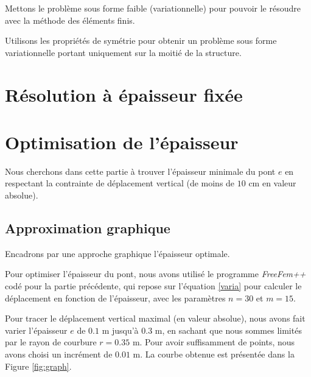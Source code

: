 \documentclass{article}
\begin{document}
    \begin{problem}{1}
    Mettons le problème sous forme faible (variationnelle) pour pouvoir le résoudre avec la méthode des éléments finis.
    \end{problem}
      
    
    

    \begin{problem}{2}
    Utilisons les propriétés de symétrie pour obtenir un problème sous forme variationnelle portant uniquement sur la moitié de la structure.
    \end{problem}
    
    

    \section{Résolution à épaisseur fixée}
        

    \section{Optimisation de l'épaisseur}
    Nous cherchons dans cette partie à trouver l'épaisseur minimale du pont $e$ en respectant la contrainte de déplacement vertical (de moins de $10$ cm en valeur absolue).

    \subsection{Approximation graphique}
    \begin{problem}{5}
        Encadrons par une approche graphique l'épaisseur optimale.
    \end{problem}
    Pour optimiser l'épaisseur du pont,
     nous avons utilisé le programme \emph{FreeFem++} codé pour la partie précédente,
     qui repose sur l'équation \ref{varia} pour calculer le déplacement en fonction de l'épaisseur, avec les paramètres $n=30$ et $m=15$.

    Pour tracer le déplacement vertical maximal (en valeur absolue),
    nous avons fait varier l'épaisseur $e$
    de $0.1$ m jusqu'à $0.3$ m, en sachant que nous sommes limités par le rayon de courbure $r = 0.35$ m.
    Pour avoir suffisamment de points, nous avons choisi un incrément de $0.01$ m.
    La courbe obtenue est présentée dans la Figure \ref{fig:graph}.
\end{document}

